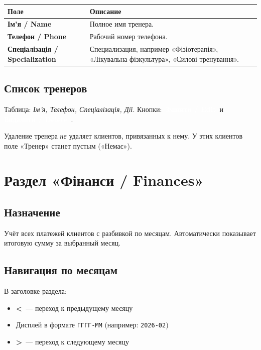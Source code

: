 \documentclass[12pt,a4paper]{article}
\newcommand{\btn}[2][primary]{%
  \textcolor{white}{\colorbox{#1}{\small\bfseries\,#2\,}}%
}
\newcommand{\btnred}[1]{\btn[danger]{#1}}
\begin{document}
\begin{center}
\begin{tabularx}{0.9\textwidth}{>{\bfseries}lX}
  \toprule
  Поле & Описание \\
  \midrule
  Ім'я / Name &
    Полное имя тренера. \\
  Телефон / Phone &
    Рабочий номер телефона. \\
  Спеціалізація / Specialization &
    Специализация, например «Фізіотерапія»,
    «Лікувальна фізкультура», «Силові тренування». \\
  \bottomrule
\end{tabularx}
\end{center}

\subsection{Список тренеров}

Таблица: \textit{Ім'я, Телефон, Спеціалізація, Дії}.
Кнопки: \btn{Змінити / Edit} и \btnred{Видалити / Delete}.

\begin{warningbox}
  Удаление тренера \emph{не} удаляет клиентов, привязанных к нему.
  У этих клиентов поле «Тренер» станет пустым («Немає»).
\end{warningbox}

\section{Раздел «Фінанси / Finances»}

\subsection{Назначение}

Учёт всех платежей клиентов с разбивкой по месяцам.
Автоматически показывает итоговую сумму за выбранный месяц.

\subsection{Навигация по месяцам}

В заголовке раздела:
\begin{itemize}
  \item \textbf{<}~--- переход к предыдущему месяцу
  \item Дисплей в формате \texttt{ГГГГ-ММ} (например: \texttt{2026-02})
  \item \textbf{>}~--- переход к следующему месяцу
\end{itemize}
\end{document}

